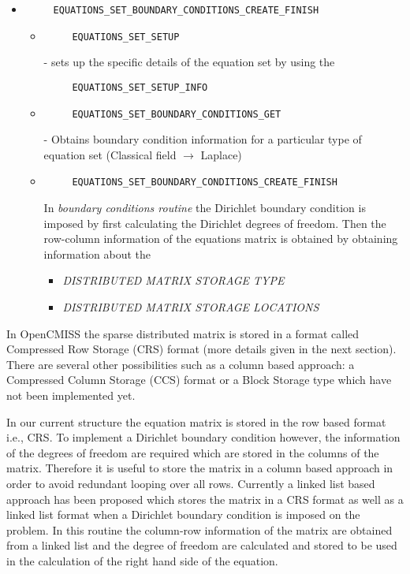 \begin{itemize}
\item \begin{verbatim}
     EQUATIONS_SET_BOUNDARY_CONDITIONS_CREATE_FINISH
    \end{verbatim} 
    \begin{itemize}
     \item  \begin{verbatim}
     EQUATIONS_SET_SETUP
    \end{verbatim} - sets up the specific details of the equation set by using the  \begin{verbatim}
     EQUATIONS_SET_SETUP_INFO
     \end{verbatim}
    \item  \begin{verbatim}
     EQUATIONS_SET_BOUNDARY_CONDITIONS_GET
    \end{verbatim} - Obtains boundary condition information for a particular type of equation set (Classical field $\rightarrow$ Laplace)
    \item \begin{verbatim}
     EQUATIONS_SET_BOUNDARY_CONDITIONS_CREATE_FINISH
    \end{verbatim} 
In \emph{boundary conditions routine}
 the Dirichlet boundary condition is imposed by first calculating the Dirichlet degrees of freedom. 
Then the row-column information of the equations matrix is obtained by obtaining information about the 
\begin{itemize}
 \item \emph{DISTRIBUTED MATRIX STORAGE TYPE}  
 \item \emph{DISTRIBUTED MATRIX STORAGE LOCATIONS}

\end{itemize}

\end{itemize}

\end{itemize}
 

 In OpenCMISS the sparse distributed matrix is stored in a format called Compressed Row Storage (CRS) format 
(more details given in the next section). There are several other possibilities such as a column based approach: a Compressed Column Storage (CCS) format or a Block Storage type which have not been implemented yet. 

In our current structure the equation matrix is stored in the row based format i.e., CRS. 
To implement a Dirichlet boundary condition however, the information of the degrees of freedom are required which are stored in the columns of the matrix. 
Therefore it is useful to store the matrix in a column based approach in order to avoid redundant looping over all rows.
Currently a linked list based approach has been proposed which stores the matrix in a CRS format as well as a linked list format 
when a Dirichlet boundary condition is imposed on the problem. In this routine the column-row information of the matrix are obtained 
from a linked list and the degree of freedom are calculated and stored to be used in the calculation of the right 
hand side of the equation.




